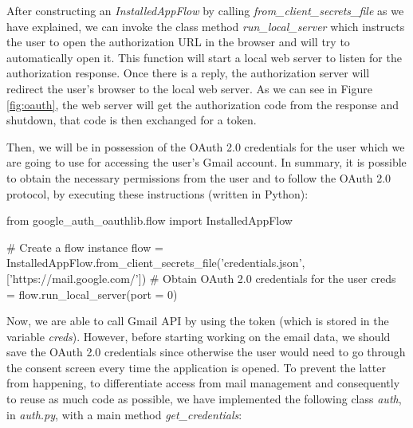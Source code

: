After constructing an \textit{InstalledAppFlow} by calling \textit{from\_client\_secrets\_file} as we have explained, we can invoke the class method \textit{run\_local\_server} which instructs the user to open the authorization URL in the browser and will try to automatically open it. This function will start a local web server to listen for the authorization response. Once there is a reply, the authorization server will redirect the user's browser to the local web server. As we can see in Figure \ref{fig:oauth}, the web server will get the authorization code from the response and shutdown, that code is then exchanged for a token.

Then, we will be in possession of the OAuth 2.0 credentials for the user \citep{oauth2.credentials} which we are going to use for accessing the user's Gmail account. In summary, it is possible to obtain the necessary permissions from the user and to follow the OAuth 2.0 protocol, by executing these instructions (written in Python):

\begin{python}
from google_auth_oauthlib.flow import InstalledAppFlow

# Create a flow instance
flow = InstalledAppFlow.from_client_secrets_file('credentials.json', 
	['https://mail.google.com/'])
# Obtain OAuth 2.0 credentials for the user
creds = flow.run_local_server(port = 0)
\end{python}

Now, we are able to call Gmail API by using the token (which is stored in the variable \textit{creds}). However, before starting working on the email data, we should save the OAuth 2.0 credentials since otherwise the user would need to go through the consent screen every time the application is opened. To prevent the latter from happening, to differentiate access from mail management and consequently to reuse as much code as possible, we have implemented the following class \textit{auth}, in \textit{auth.py}, with a main method \textit{get\_credentials}:

